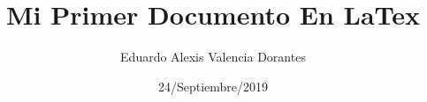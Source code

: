\documentclass{article}%
\title{Mi Primer Documento En LaTex}
\author{Eduardo Alexis Valencia Dorantes}
\date{24/Septiembre/2019}
\begin{document}
\maketitle

\begin{abstract}

\end{abstract}

\section{}
\end{document}
